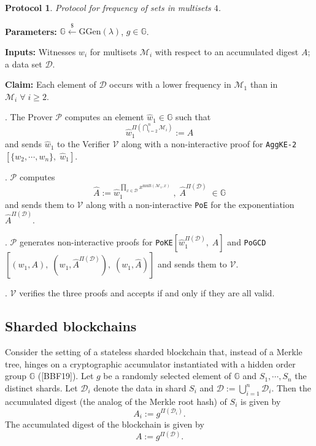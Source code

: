 \documentclass[11pt, lettersize, notitlepage, leqno, footskip=0.6cm]{article}
\newcommand{\pl}{\prod\limits}
\newcommand{\mc}{\mathcal}
\newcommand{\mb}{\mathbb}
\newcommand{\mr}{\mathrm}
\newcommand{\lamb}{\lambda}
\newcommand{\what}{\widehat}
\newcommand{\mP}{\mc{P}}
\newcommand{\V}{\mc{V}}
\newcommand{\vs}{\vspace{-0.15cm}}
\newcommand{\noin}{\noindent}
\newcommand{\nons}{non-interactive proofs}
\newtheorem{Prot}[Thm]{Protocol}
\numberwithin{equation}{section}
\begin{document}
\begin{Prot} Protocol for frequency of sets in multisets $4$.\end{Prot} \vspace{-0.3cm}

\noin \textbf{Parameters:} $\mb{G}\xleftarrow{\$} \mr{GGen}(\lamb)$,\; $g\in \mb{G}$.

\noin \textbf{Inputs:} Witnesses $w_i$ for multisets $\mc{M}_i$ with respect to an accumulated digest $A$; a data set $\mc{D}$.

\noin \textbf{Claim:} Each element of $\mc{D}$ occurs with a lower frequency in $\mc{M}_1$ than in $\mc{M}_i\;\forall\;i\geq 2$.

\begin{prf1}\noin {}. The Prover $\mP$ computes an element $\what{w}_1\in\mb{G}$ such that \vs $$\what{w}_1^{\Pi(\bigcap\limits_{i=2}^n \mc{M}_i)}:= A$$ and sends $\what{w}_1$ to the Verifier $\V$ along with a non-interactive proof for \verb|AggKE-2|$[\{w_2,\cdots,w_n\},\;\what{w}_1]$.

\noin 2. $\mP$ computes \vs $$\what{A}:= \what{w}_1^{\pl_{x\in\mc{D}}x^{\mr{mult}(\mc{M}_1,x)}}\;,\;\what{A}^{\Pi(\mc{D})}\;\in\mb{G}$$ and sends them to $\V$ along with a non-interactive \verb|PoE| for the exponentiation $\what{A}^{\Pi(\mc{D})}$.

\noin 3. $\mP$ generates \nons\; for \verb|PoKE|$[\what{w}_1^{\Pi(\mc{D})},\;A]$ and \verb|PoGCD|$[(w_1,A),\;(w_1, \what{A}^{\Pi(\mc{D})}),\;(w_1, \what{A})]$ and sends them to $\V$.

\noin 4. $\V$ verifies the three proofs and accepts if and only if they are all valid.\end{prf1}




\bigskip

\subsection{\fontsize{11}{11} Sharded blockchains}

Consider the setting of a stateless sharded blockchain that, instead of a Merkle tree, hinges on a cryptographic accumulator instantiated with a hidden order group $\mb{G}$ ([BBF19]). Let $g$ be a randomly selected element of $\mb{G}$ and $S_1,\cdots, S_n$ the distinct shards. Let $\mc{D}_i$ denote the data in shard $S_i$ and $\mc{D}:= \bigcup\limits_{i=1}^n \mc{D}_i$. Then the accumulated digest (the analog of the Merkle root hash) of $S_i$ is given by \vs $$A_i:= g^{\Pi(\mc{D}_i)}.$$  The accumulated digest of the blockchain is given by \vs $$A:= g^{\Pi(\mc{D})}.$$
\end{document}

